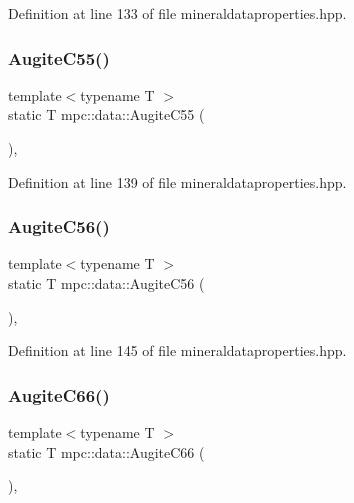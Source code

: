 Definition at line 133 of file mineraldataproperties.\+hpp.

\mbox{\label{namespacempc_1_1data_a2da60e27c288386552357af94b308cc4}} 
\subsubsection{\texorpdfstring{Augite\+C55()}{AugiteC55()}}
{\footnotesize\ttfamily template$<$typename T $>$ \\
static T mpc\+::data\+::\+Augite\+C55 (\begin{DoxyParamCaption}{ }\end{DoxyParamCaption})\hspace{0.3cm}{\ttfamily [inline]}, {\ttfamily [static]}}



Definition at line 139 of file mineraldataproperties.\+hpp.

\mbox{\label{namespacempc_1_1data_aacea95abc86c017e0966d8a34aaeb8cb}} 
\subsubsection{\texorpdfstring{Augite\+C56()}{AugiteC56()}}
{\footnotesize\ttfamily template$<$typename T $>$ \\
static T mpc\+::data\+::\+Augite\+C56 (\begin{DoxyParamCaption}{ }\end{DoxyParamCaption})\hspace{0.3cm}{\ttfamily [inline]}, {\ttfamily [static]}}



Definition at line 145 of file mineraldataproperties.\+hpp.

\mbox{\label{namespacempc_1_1data_ad769ef8aab929b4093ec9257a7ae0aa2}} 
\subsubsection{\texorpdfstring{Augite\+C66()}{AugiteC66()}}
{\footnotesize\ttfamily template$<$typename T $>$ \\
static T mpc\+::data\+::\+Augite\+C66 (\begin{DoxyParamCaption}{ }\end{DoxyParamCaption})\hspace{0.3cm}{\ttfamily [inline]}, {\ttfamily [static]}}



